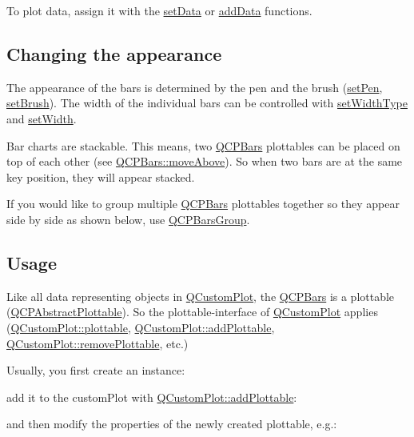 To plot data, assign it with the \hyperlink{class_q_c_p_bars_aa3435aab19e0a49e4e7b41bd36a8d96b}{set\+Data} or \hyperlink{class_q_c_p_bars_a1f29cf08615040993209147fa68de3f2}{add\+Data} functions.\hypertarget{class_q_c_p_statistical_box_appearance}{}\subsection{Changing the appearance}\label{class_q_c_p_statistical_box_appearance}
The appearance of the bars is determined by the pen and the brush (\hyperlink{class_q_c_p_abstract_plottable_ab74b09ae4c0e7e13142fe4b5bf46cac7}{set\+Pen}, \hyperlink{class_q_c_p_abstract_plottable_a7a4b92144dca6453a1f0f210e27edc74}{set\+Brush}). The width of the individual bars can be controlled with \hyperlink{class_q_c_p_bars_adcaa3b41281bb2c0f7949b341592fcc0}{set\+Width\+Type} and \hyperlink{class_q_c_p_bars_afec6116579d44d5b706e0fa5e5332507}{set\+Width}.

Bar charts are stackable. This means, two \hyperlink{class_q_c_p_bars}{Q\+C\+P\+Bars} plottables can be placed on top of each other (see \hyperlink{class_q_c_p_bars_ac22e00a6a41509538c21b04f0a57318c}{Q\+C\+P\+Bars\+::move\+Above}). So when two bars are at the same key position, they will appear stacked.

If you would like to group multiple \hyperlink{class_q_c_p_bars}{Q\+C\+P\+Bars} plottables together so they appear side by side as shown below, use \hyperlink{class_q_c_p_bars_group}{Q\+C\+P\+Bars\+Group}.

\hypertarget{class_q_c_p_statistical_box_usage}{}\subsection{Usage}\label{class_q_c_p_statistical_box_usage}
Like all data representing objects in \hyperlink{class_q_custom_plot}{Q\+Custom\+Plot}, the \hyperlink{class_q_c_p_bars}{Q\+C\+P\+Bars} is a plottable (\hyperlink{class_q_c_p_abstract_plottable}{Q\+C\+P\+Abstract\+Plottable}). So the plottable-\/interface of \hyperlink{class_q_custom_plot}{Q\+Custom\+Plot} applies (\hyperlink{class_q_custom_plot_a32de81ff53e263e785b83b52ecd99d6f}{Q\+Custom\+Plot\+::plottable}, \hyperlink{class_q_custom_plot_ab7ad9174f701f9c6f64e378df77927a6}{Q\+Custom\+Plot\+::add\+Plottable}, \hyperlink{class_q_custom_plot_af3dafd56884208474f311d6226513ab2}{Q\+Custom\+Plot\+::remove\+Plottable}, etc.)

Usually, you first create an instance\+: 
\begin{DoxyCodeInclude}
\end{DoxyCodeInclude}
add it to the custom\+Plot with \hyperlink{class_q_custom_plot_ab7ad9174f701f9c6f64e378df77927a6}{Q\+Custom\+Plot\+::add\+Plottable}\+: 
\begin{DoxyCodeInclude}
\end{DoxyCodeInclude}
and then modify the properties of the newly created plottable, e.\+g.\+: 
\begin{DoxyCodeInclude}
\end{DoxyCodeInclude}


